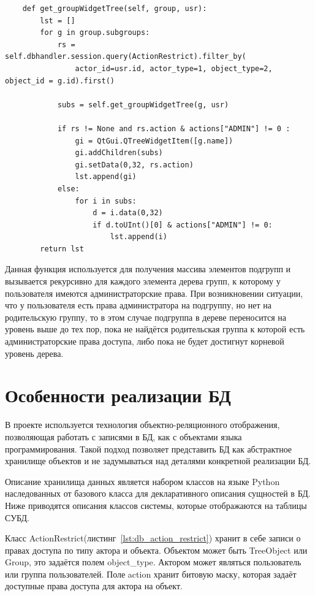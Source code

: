 \documentclass[utf8,usehyperref,12pt]{G7-32}
\begin{document}
\lstset{language=Python,caption=Обход дерева групп,label=lst:groups}
\begin{lstlisting}        
    def get_groupWidgetTree(self, group, usr):        
        lst = []
        for g in group.subgroups:
            rs = self.dbhandler.session.query(ActionRestrict).filter_by(
	            actor_id=usr.id, actor_type=1, object_type=2, object_id = g.id).first()
	            
            subs = self.get_groupWidgetTree(g, usr)
            
            if rs != None and rs.action & actions["ADMIN"] != 0 :
                gi = QtGui.QTreeWidgetItem([g.name])
                gi.addChildren(subs)
                gi.setData(0,32, rs.action)
                lst.append(gi)
            else:                
                for i in subs:
                    d = i.data(0,32)
                    if d.toUInt()[0] & actions["ADMIN"] != 0:
                        lst.append(i)                
        return lst
\end{lstlisting}

Данная функция используется для получения массива элементов подгрупп и вызывается рекурсивно для каждого элемента дерева групп, к которому у пользователя имеются администраторские права. При возникновении ситуации, что у пользователя есть права администратора на подгруппу, но нет на родительскую группу, то в этом случае подгруппа в дереве переносится на уровень выше до тех пор, пока не найдётся родительская группа к которой есть администраторские права доступа, либо пока не будет достигнут корневой уровень дерева.

\section{Особенности реализации БД}
В проекте используется технология объектно-реляционного отображения, позволяющая работать с записями в БД, как с объектами языка программирования. Такой подход позволяет представить БД как абстрактное хранилище объектов и не задумываться над деталями конкретной реализации БД. 

Описание хранилища данных является набором классов на языке Python наследованных от базового класса для декларативного описания сущностей в БД. Ниже приводятся описания классов системы, которые отображаются на таблицы СУБД.

Класс ActionRestrict(листинг~\ref{lst:db_action_restrict}) хранит в себе записи о правах доступа по типу актора и объекта. Объектом может быть TreeObject или Group, это задаётся полем object\_type. Актором может являться пользователь или группа пользователей. Поле action хранит битовую маску, которая задаёт доступные права доступа для актора на объект.
\end{document}
